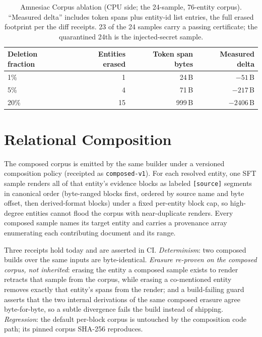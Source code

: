 \documentclass{article}
\begin{document}
\begin{table}[t]
\centering
\caption{Amnesiac Corpus ablation (CPU side; the 24-sample, 76-entity corpus). ``Measured delta'' includes token spans plus entity-id list entries, the full erased footprint per the diff receipts. 23 of the 24 samples carry a passing certificate; the quarantined 24th is the injected-secret sample.}
\label{tab:erasure}
\scriptsize
\begin{tabular}{lrrr}
\toprule
Deletion fraction & Entities erased & Token span bytes & Measured delta \\
\midrule
1\% & 1 & 24\,B & $-51$\,B \\
5\% & 4 & 71\,B & $-217$\,B \\
20\% & 15 & 999\,B & $-2406$\,B \\
\bottomrule
\end{tabular}
\end{table}

\section{Relational Composition}
\label{sec:composition}

The composed corpus is emitted by the same builder under a versioned composition policy (receipted as \texttt{composed-v1}). For each resolved entity, one SFT sample renders all of that entity's evidence blocks as labeled \texttt{[source]} segments in canonical order (byte-ranged blocks first, ordered by source name and byte offset, then derived-format blocks) under a fixed per-entity block cap, so high-degree entities cannot flood the corpus with near-duplicate renders. Every composed sample names its target entity and carries a provenance array enumerating each contributing document and its range.

Three receipts hold today and are asserted in CI. \emph{Determinism}: two composed builds over the same inputs are byte-identical. \emph{Erasure re-proven on the composed corpus, not inherited}: erasing the entity a composed sample exists to render retracts that sample from the corpus, while erasing a co-mentioned entity removes exactly that entity's spans from the render; and a build-failing guard asserts that the two internal derivations of the same composed erasure agree byte-for-byte, so a subtle divergence fails the build instead of shipping. \emph{Regression}: the default per-block corpus is untouched by the composition code path; its pinned corpus SHA-256 reproduces.
\end{document}

